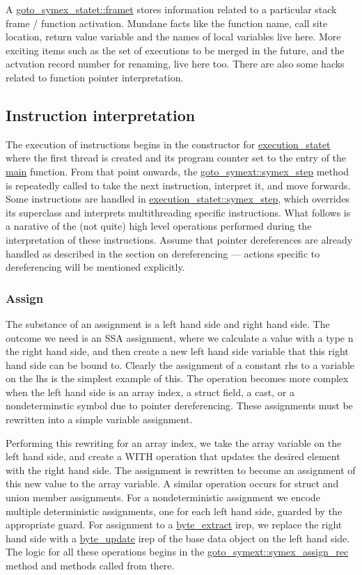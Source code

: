 \documentclass{article}
\begin{document}
A \url{goto_symex_statet::framet} stores information related to a
particular stack frame / function activation. Mundane facts like the function
name, call site location, return value variable and the names of local variables
live here. More exciting items such as the set of executions to be merged in
the future, and the actvation record number for renaming, live here too.
There are also some hacks related to function pointer interpretation.

\subsection{Instruction interpretation}

The execution of instructions begins in the constructor for
\url{execution_statet} where the first thread is created and its program
counter set to the entry of the \url{main} function. From that point
onwards, the \url{goto_symext::symex_step} method is repeatedly called
to take the next instruction, interpret it, and move forwards. Some
instructions are handled in \url{execution_statet::symex_step},
which overrides its superclass and interprets multithreading specific
instructions. What follows is a narative of the (not quite) high level
operations performed during the interpretation of these instructions. Assume
that pointer dereferences are already handled as described in the section
on dereferencing --- actions specific to dereferencing will be mentioned
explicitly.

\subsubsection{Assign}

The substance of an assignment is a left hand side and right hand side. The
outcome we need is an SSA assignment, where we calculate a value with a type
n the right hand side, and then create a new left hand side variable that this
right hand side can be bound to. Clearly the assignment of a constant rhs to
a variable on the lhs is the simplest example of this. The operation becomes
more complex when the left hand side is an array index, a struct field,
a cast, or a nondeterminstic symbol due to pointer dereferencing. These
assignments must be rewritten into a simple variable assignment.

Performing this rewriting for an array index, we take the array variable
on the left hand side, and create a WITH operation that updates the desired
element with the right hand side. The assignment is rewritten to become an
assignment of this new value to the array variable. A similar operation
occurs for struct and union member assignments. For a nondeterministic
assignment we encode multiple deterministic assignments, one for each left
hand side, guarded by the appropriate guard. For assignment to a
\url{byte_extract} irep, we replace the right hand side with a
\url{byte_update} irep of the base data object on the left hand side.
The logic for all these operations begins in the
\url{goto_symext::symex_assign_rec} method and methods called from there.
\end{document}
